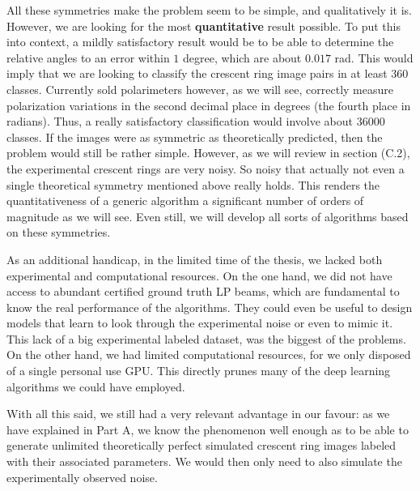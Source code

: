 \documentclass[11pt, a4paper, twoside]{article} %
\begin{document}

All these symmetries make the problem seem to be simple, and qualitatively it is. However, we are looking for the most {\bf quantitative} result possible. To put this into context, a mildly satisfactory result would be to be able to determine the relative angles to an error within $1$ degree, which are about $0.017$ rad. This would imply that we are looking to classify the crescent ring image pairs in at least 360 classes. Currently sold polarimeters however, as we will see, correctly measure polarization variations in the second decimal place in degrees (the fourth place in radians). Thus, a really satisfactory classification would involve about 36000 classes. If the images were as symmetric as theoretically predicted, then the problem would still be rather simple. However, as we will review in section (C.2), the experimental crescent rings are very noisy. So noisy that actually not even a single theoretical symmetry mentioned above really holds. This renders the quantitativeness of a generic algorithm a significant number of orders of magnitude as we will see. Even still, we will develop all sorts of algorithms based on these symmetries.

As an additional handicap, in the limited time of the thesis, we lacked both experimental and computational resources. On the one hand, we did not have access to abundant certified ground truth LP beams, which are fundamental to know the real performance of the algorithms. They could even be useful to design models that learn to look through the experimental noise or even to mimic it. This lack of a big experimental labeled dataset, was the biggest of the problems. On the other hand, we had limited computational resources, for we only disposed of a single personal use GPU. This directly prunes many of the deep learning algorithms we could have employed.


With all this said, we still had a very relevant advantage in our favour: as we have explained in Part A, we know the phenomenon well enough as to be able to generate unlimited theoretically perfect simulated crescent ring images labeled with their associated parameters. We would then only need to also simulate the experimentally observed noise.
\vspace{-0.3cm}
\end{document}
